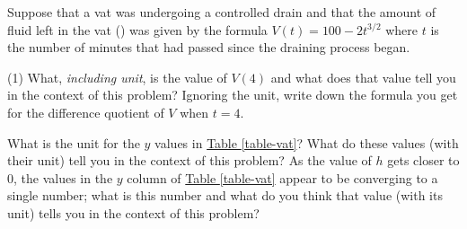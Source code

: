 \documentclass[12pt,]{book}
\theoremstyle{plain}
\theoremstyle{definition}
\numberwithin{equation}{section}
\newcommand{\hrulemedium}{\noalign{\hrule height 0.07em}}
\newcommand{\hrulethick} {\noalign{\hrule height 0.11em}}
\newcounter{figstack}
\newcounter{figindex}
\newlength\fight
\newcommand\pushValignCaptionBottom[5][b]{%
\stepcounter{figstack}%
\expandafter\def\csname %
figalign\romannumeral\value{figstack}\endcsname{#1}%
\expandafter\def\csname %
figtype\romannumeral\value{figstack}\endcsname{#2}%
\expandafter\def\csname %
figwd\romannumeral\value{figstack}\endcsname{#3}%
\expandafter\def\csname %
figcontent\romannumeral\value{figstack}\endcsname{#4}%
\expandafter\def\csname %
figcap\romannumeral\value{figstack}\endcsname{#5}%
\setbox0=\hbox{%
\begin{#2}{#3}#4\end{#2}}%
\ifdim\dimexpr\ht0+\dp0\relax>\fight\global\setlength{\fight}{%
\dimexpr\ht0+\dp0\relax}\fi%
}
\newcommand\popValignCaptionBottom{%
\setcounter{figindex}{0}%
\hfill%
\whiledo{\value{figindex}<\value{figstack}}{%
\stepcounter{figindex}%
\def\tmp{\csname figwd\romannumeral\value{figindex}\endcsname}%
\begin{\csname figtype\romannumeral\value{figindex}\endcsname}[t]{\tmp}%
\centering%
\stackinset{c}{}%
{\csname figalign\romannumeral\value{figindex}\endcsname}{}%
{\csname figcontent\romannumeral\value{figindex}\endcsname}%
{\rule{0pt}{\fight}}\par%
\csname figcap\romannumeral\value{figindex}\endcsname%
\end{\csname figtype\romannumeral\value{figindex}\endcsname}%
\hfill%
}%
\setcounter{figstack}{0}%
\setlength{\fight}{0pt}%
\hfill%
}
\newcommand{\fe}[2]{#1\mathopen{}\left(#2\right)\mathclose{}}
\begin{document}
\hypertarget{exercisegroup-vat}{\null}Suppose that a vat was undergoing a controlled drain and that the amount of fluid left in the vat (\si{\gallon}) was given by the formula \(\fe{V}{t}=100-2t^{3/2}\) where \(t\) is the number of minutes that had passed since the draining process began.%
\par
\begin{exercisegroup}(1)
\exercise[18.]\hypertarget{exercise-vat-first}{\null}What, \emph{including unit}, is the value of \(\fe{V}{4}\) and what does that value tell you in the context of this problem?%
\exercise[19.]\hypertarget{exercise-27}{\null}Ignoring the unit, write down the formula you get for the difference quotient of \(V\) when \(t=4\).%
\exercise[20.]\hypertarget{exercise-28}{\null}What is the unit for the \(y\) values in \hyperref[table-vat]{Table \ref{table-vat}}? What do these values (with their unit) tell you in the context of this problem?%
\exercise[21.]\hypertarget{exercise-vat-last}{\null}As the value of \(h\) gets closer to \(0\), the values in the \(y\) column of \hyperref[table-vat]{Table \ref{table-vat}} appear to be converging to a single number; what is this number and what do you think that value (with its unit) tells you in the context of this problem?%
\end{exercisegroup}
\par\smallskip\noindent
\typeout{************************************************}
\typeout{************************************************}
\end{document}

